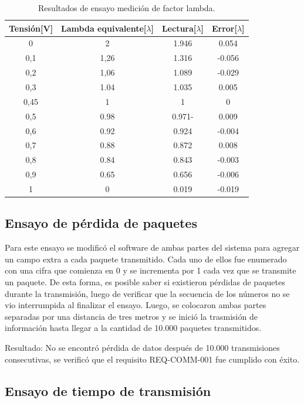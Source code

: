 \begin{table}[htpb]
	\centering
	\caption{Resultados de ensayo medición de factor lambda.}
	\centering
	\begin{tabular}{c c c c}    
		\toprule
		\textbf{Tensión[V]} & \textbf{Lambda equivalente[$\lambda$]} & \textbf{Lectura[$\lambda$]} & \textbf{Error[$\lambda$]} \\
		\midrule
		0		&	2	 & 1.946 & 0.054 \\		
		0,1		&   1,26 & 1.316 & -0.056 \\
		0,2		&   1,06 & 1.089 & -0.029 \\
		0,3		&   1.04 & 1.035 & 0.005 \\
		0,45	&   1 	 & 1 	 & 0 \\
		0,5		&   0.98 & 0.971- & 0.009 \\
		0,6		&   0.92 & 0.924 & -0.004 \\
		0,7		&   0.88 & 0.872 & 0.008 \\
		0,8		&   0.84 & 0.843 & -0.003 \\
		0,9		&   0.65 & 0.656 & -0.006 \\
		1		&   0	 & 0.019 & -0.019 \\
		\bottomrule
	\end{tabular}
	\label{tab:ensayo-o2}
\end{table}

\subsection{Ensayo de pérdida de paquetes}

Para este ensayo se modificó el software de ambas partes del sistema para agregar un campo extra a cada paquete transmitido. Cada uno de ellos fue enumerado con una cifra que comienza en 0 y se incrementa por 1 cada vez que se transmite un paquete. De esta forma, es posible saber si existieron pérdidas de paquetes durante la transmisión, luego de verificar que la secuencia de los números no se vio interrumpida al finalizar el ensayo. Luego, se colocaron ambas partes separadas por una distancia de tres metros y se inició la trasmisión de información hasta llegar a la cantidad de 10.000 paquetes transmitidos.

Resultado: No se encontró pérdida de datos después de 10.000 transmisiones consecutivas, se verificó que el requisito REQ-COMM-001 fue cumplido con éxito.

\subsection{Ensayo de tiempo de transmisión}


